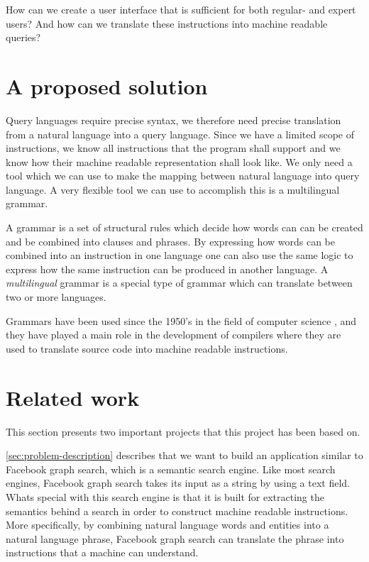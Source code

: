 How can we create a user interface that is sufficient for both regular- and expert users? And how can we translate these instructions into machine readable queries?

\section{A proposed solution}
Query languages require precise syntax, we therefore need precise translation from a natural language into a query language. Since we have a limited scope of instructions, we know all instructions that the program shall support and we know how their machine readable representation shall look like. We only need a tool which we can use to make the mapping between natural language into query language. A very flexible tool we can use to accomplish this is a multilingual grammar. \cite{citation-needed}

A grammar is a set of structural rules which decide how words can can be created and be combined into clauses and phrases. By expressing how words can be combined into an instruction in one language one can also use the same logic to express how the same instruction can be produced in another language. A \emph{multilingual} grammar is a special type of grammar which can translate between two or more languages. \cite{citation-needed}

Grammars have been used since the 1950's in the field of computer science \cite[p. 4]{ranta:2011}, and they have played a main role in the development of compilers where they are used to translate source code into machine readable instructions.

\section{Related work}
This section presents two important projects that this project has been based on.

\autoref{sec:problem-description} describes that we want to build an application similar to Facebook graph search, which is a semantic search engine. \cite{citation-needed} Like most search engines, Facebook graph search takes its input as a string by using a text field. Whats special with this search engine is that it is built for extracting the semantics behind a search in order to construct machine readable instructions. More specifically, by combining natural language words and entities into a natural language phrase, Facebook graph search can translate the phrase into instructions that a machine can understand.

